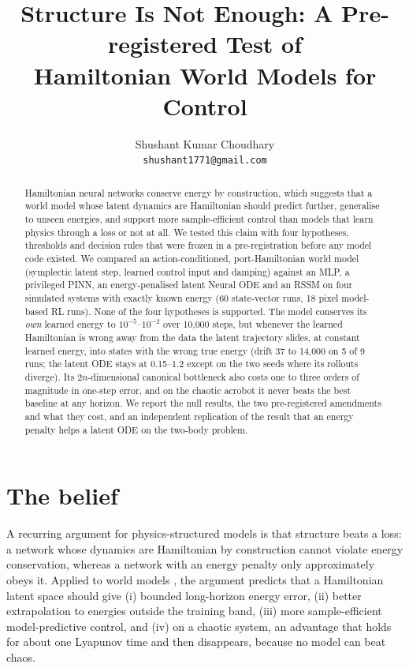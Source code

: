 \documentclass[10pt]{article}
\title{Structure Is Not Enough: A Pre-registered Test of\\Hamiltonian World Models for Control}
\author{Shushant Kumar Choudhary\\\texttt{shushant1771@gmail.com}}
\date{}
\begin{document}
\maketitle

\begin{abstract}
Hamiltonian neural networks conserve energy by construction, which suggests that a world model whose
latent dynamics are Hamiltonian should predict further, generalise to unseen energies, and support more
sample-efficient control than models that learn physics through a loss or not at all. We tested this
claim with four hypotheses, thresholds and decision rules that were frozen in a pre-registration before
any model code existed. We compared an action-conditioned, port-Hamiltonian world model (symplectic
latent step, learned control input and damping) against an MLP, a privileged PINN, an energy-penalised
latent Neural ODE and an RSSM on four simulated systems with exactly known energy (60 state-vector runs,
18 pixel model-based RL runs). None of the four hypotheses is supported. The model conserves its
\emph{own} learned energy to $10^{-5}$--$10^{-2}$ over 10,000 steps, but whenever the learned Hamiltonian
is wrong away from the data the latent trajectory slides, at constant learned energy, into states with
the wrong true energy (drift 37 to 14,000 on 5 of 9 runs; the latent ODE stays at 0.15--1.2 except on the two seeds where
its rollouts diverge). Its
2$n$-dimensional canonical bottleneck also costs one to three orders of magnitude in one-step error,
and on the chaotic acrobot it never beats the best baseline at any horizon. We report the null results,
the two pre-registered amendments and what they cost, and an independent replication of the result
that an energy penalty helps a latent ODE on the two-body problem.
\end{abstract}

\section{The belief}

A recurring argument for physics-structured models is that structure beats a loss: a network whose
dynamics are Hamiltonian by construction \citep{greydanus2019hnn,toth2020hgn,zhong2020symoden} cannot
violate energy conservation, whereas a network with an energy penalty \citep{raissi2019pinn} only
approximately obeys it. Applied to world models
\citep{ha2018worldmodels,hafner2019planet}, the argument predicts that a Hamiltonian latent space should
give (i) bounded long-horizon energy error, (ii) better extrapolation to energies outside the training
band, (iii) more sample-efficient model-predictive control, and (iv) on a chaotic system, an advantage
that holds for about one Lyapunov time and then disappears, because no model can beat chaos.
\end{document}
